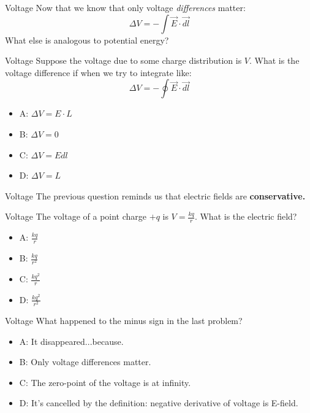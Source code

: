 \documentclass{beamer}
\begin{document}
\begin{frame}{Voltage}
Now that we know that only voltage \textit{differences} matter:
\begin{equation}
\Delta V = - \int \vec{E} \cdot \vec{dl}
\end{equation}
What else is analogous to potential energy?
\end{frame}

\begin{frame}{Voltage}
Suppose the voltage due to some charge distribution is $V$.  What is the voltage difference if when we try to integrate like:
\begin{equation}
\Delta V = - \oint \vec{E} \cdot \vec{dl}
\end{equation}
\begin{itemize}
\item A: $\Delta V = E \cdot L$
\item B: $\Delta V = 0$
\item C: $\Delta V = E dl$
\item D: $\Delta V = L$
\end{itemize}
\end{frame}

\begin{frame}{Voltage}
The previous question reminds us that electric fields are \textbf{conservative.}
\end{frame}

\begin{frame}{Voltage}
The voltage of a point charge $+q$ is $V = \frac{kq}{r}$.  What is the electric field?
\begin{itemize}
\item A: $\frac{kq}{r}$
\item B: $\frac{kq}{r^2}$
\item C: $\frac{kq^2}{r}$
\item D: $\frac{kq^2}{r^2}$
\end{itemize}
\end{frame}

\begin{frame}{Voltage}
What happened to the minus sign in the last problem?
\begin{itemize}
\item A: It disappeared...because.
\item B: Only voltage differences matter.
\item C: The zero-point of the voltage is at infinity.
\item D: It's cancelled by the definition: negative derivative of voltage is E-field.
\end{itemize}
\end{frame}
\end{document}

